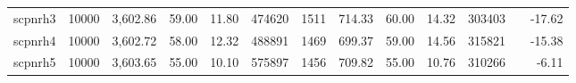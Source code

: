 \documentclass[11pt]{article}
\begin{document}
\begin{landscape}
\begin{table}[]
\begin{tabular}{rrr|rrr|rrrrr|rr}
            scpnrh3 & 10000 & 3,602.86    & 59.00   & 11.80 & 474620    & 1511 & 714.33         & 60.00   & 14.32 & 303403    &  & -17.62   \\
            scpnrh4 & 10000 & 3,602.72    & 58.00   & 12.32 & 488891    & 1469 & 699.37         & 59.00   & 14.56 & 315821    &  & -15.38   \\
            scpnrh5 & 10000 & 3,603.65    & 55.00   & 10.10 & 575897    & 1456 & 709.82         & 55.00   & 10.76 & 310266    &  & -6.11
        \end{tabular}
    \end{table}
\end{landscape}
\end{document}
